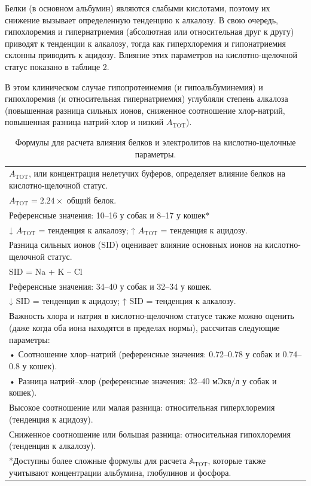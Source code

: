 \documentclass[a4paper,12pt]{book}
\begin{document}
Белки (в основном альбумин) являются слабыми кислотами, поэтому их снижение вызывает определенную тенденцию к алкалозу. В свою очередь, гипохлоремия и гипернатриемия (абсолютная или относительная друг к другу) приводят к тенденции к алкалозу, тогда как гиперхлоремия и гипонатриемия склонны приводить к ацидозу. Влияние этих параметров на кислотно-щелочной статус показано в таблице 2.

В этом клиническом случае гипопротеинемия (и гипоальбуминемия) и гипохлоремия (и относительная гипернатриемия) углубляли степень алкалоза (повышенная разница сильных ионов, сниженное соотношение хлор-натрий, повышенная разница натрий-хлор и низкий $A_{\mathrm{TOT}}$).

\begin{table}[htbp]
\centering
\caption{Формулы для расчета влияния белков и электролитов на кислотно-щелочные параметры.}
\begin{tabular}{p{14cm}}
\toprule
$A_{\mathrm{TOT}}$, или концентрация нелетучих буферов, определяет влияние белков на кислотно-щелочной статус. \\
$A_{\mathrm{TOT}} = 2.24 \times $ общий белок. \\
Референсные значения: 10--16 у собак и 8--17 у кошек* \\
↓ $A_{\mathrm{TOT}}$ = тенденция к алкалозу; ↑ $A_{\mathrm{TOT}}$ = тенденция к ацидозу. \\
\midrule
Разница сильных ионов (SID) оценивает влияние основных ионов на кислотно-щелочной статус. \\
SID = Na + K – Cl \\
Референсные значения: 34--40 у собак и 32--34 у кошек. \\
↓ SID = тенденция к ацидозу; ↑ SID = тенденция к алкалозу. \\
\midrule
Важность хлора и натрия в кислотно-щелочном статусе также можно оценить (даже когда оба иона находятся в пределах нормы), рассчитав следующие параметры: \\
• Соотношение хлор--натрий (референсные значения: 0.72--0.78 у собак и 0.74--0.8 у кошек). \\
• Разница натрий--хлор (референсные значения: 32--40 мЭкв/л у собак и кошек). \\
Высокое соотношение или малая разница: относительная гиперхлоремия (тенденция к ацидозу). \\
Сниженное соотношение или большая разница: относительная гипохлоремия (тенденция к алкалозу). \\
\bottomrule
\multicolumn{1}{l}{*Доступны более сложные формулы для расчета $\mathbb{A}_{\mathrm{TOT}}$, которые также учитывают концентрации альбумина, глобулинов и фосфора.}
\end{tabular}
\end{table}
\end{document}
